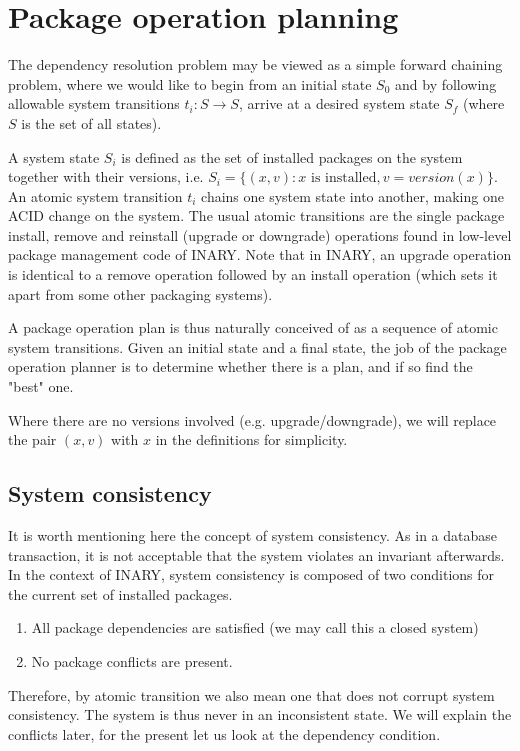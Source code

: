 \documentclass[a4paper,11pt]{article}
\begin{document}
\section{Package operation planning}

The dependency resolution problem may be viewed as a simple forward
chaining problem, where we would like to begin from an initial state
$S_0$ and by following allowable system transitions $t_i: S \to S$,
arrive at a desired system state $S_f$ (where $S$ is the set of all states).

A system state $S_i$ is defined as the set of installed packages on
the system together with their versions, i.e. $S_i = \{ (x,v) : x
\text{ is installed}, v=version(x)\} $. An atomic system transition
$t_i$ chains one system state into another, making one ACID change on
the system. The usual atomic transitions are the single package
install, remove and reinstall (upgrade or downgrade) operations found
in low-level package management code of INARY. Note that in INARY, an
upgrade operation is identical to a remove operation followed by an
install operation (which sets it apart from some other packaging
systems).

A package operation plan is thus naturally conceived of as a sequence
of atomic system transitions. Given an initial state and a final
state, the job of the package operation planner is to determine
whether there is a plan, and if so find the "best" one.

Where there are no versions involved (e.g. upgrade/downgrade), we will
replace the pair $(x,v)$ with $x$ in the definitions for simplicity.

\subsection{System consistency}

It is worth mentioning here the concept of system consistency. As in a
database transaction, it is not acceptable that the system violates an
invariant afterwards. In the context of INARY, system consistency is
composed of two conditions for the current set of installed packages.
\begin{enumerate}
\item All package dependencies are satisfied (we may call this a
  closed system)
\item No package conflicts are present.
\end{enumerate}

Therefore, by atomic transition we also mean one that does not corrupt
system consistency. The system is thus never in an inconsistent
state. We will explain the conflicts later, for the present let us
look at the dependency condition.
\end{document}
